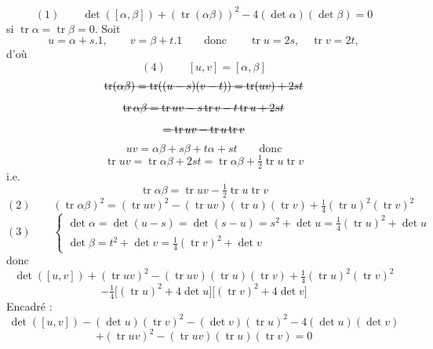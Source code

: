 \documentclass[11pt,a4paper]{article}
\begin{document}
\[
  (1) \qquad \det([\alpha,\beta]) + (\operatorname{tr}(\alpha\beta))^{2} - 4(\det\alpha)(\det\beta) = 0
\]
si $\operatorname{tr}\alpha = \operatorname{tr}\beta = 0$. Soit
\[
  u = \alpha + s.1, \qquad v = \beta + t.1 \qquad \text{donc} \qquad
  \operatorname{tr} u = 2s, \quad \operatorname{tr} v = 2t,
\]
d'où
\[
  (4) \qquad [u,v] = [\alpha,\beta]
\]
\[
  \text{\struck{$\operatorname{tr}(\alpha\beta) = \operatorname{tr}((u-s)(v-t)) = \operatorname{tr}(uv) + 2st$}}
\]
\[
  \text{\struck{$\operatorname{tr}\alpha\beta = \operatorname{tr} uv - s\operatorname{tr} v - t\operatorname{tr} u + 2st$}}
\]
\[
  \text{\struck{$= \operatorname{tr} uv - \operatorname{tr} u \operatorname{tr} v$}}
\]
\[
  uv = \alpha\beta + s\beta + t\alpha + st \qquad \text{donc}
\]
\[
  \operatorname{tr} uv = \operatorname{tr}\alpha\beta + 2st = \operatorname{tr}\alpha\beta + \tfrac{1}{2}\operatorname{tr} u \operatorname{tr} v
\]
i.e.\
\[
  \operatorname{tr}\alpha\beta = \operatorname{tr} uv - \tfrac{1}{2}\operatorname{tr} u \operatorname{tr} v
\]
\[
  (2) \qquad (\operatorname{tr}\alpha\beta)^{2} = (\operatorname{tr} uv)^{2} - (\operatorname{tr} uv)(\operatorname{tr} u)(\operatorname{tr} v) + \tfrac{1}{4}(\operatorname{tr} u)^{2}(\operatorname{tr} v)^{2}
\]
\[
  (3) \qquad
  \begin{cases}
    \det\alpha = \det(u-s) = \det(s-u) = s^{2} + \det u = \tfrac{1}{4}(\operatorname{tr} u)^{2} + \det u \\
    \det\beta = t^{2} + \det v = \tfrac{1}{4}(\operatorname{tr} v)^{2} + \det v
  \end{cases}
\]
donc
\[
  \det([u,v]) + (\operatorname{tr} uv)^{2} - (\operatorname{tr} uv)(\operatorname{tr} u)(\operatorname{tr} v) + \tfrac{1}{4}(\operatorname{tr} u)^{2}(\operatorname{tr} v)^{2}
\]
\[
  - \tfrac{1}{4}\bigl[(\operatorname{tr} u)^{2} + 4\det u\bigr]\bigl[(\operatorname{tr} v)^{2} + 4\det v\bigr]
\]
Encadré :
\[
  \det([u,v]) - (\det u)(\operatorname{tr} v)^{2} - (\det v)(\operatorname{tr} u)^{2} - 4(\det u)(\det v)
\]
\[
  + (\operatorname{tr} uv)^{2} - (\operatorname{tr} uv)(\operatorname{tr} u)(\operatorname{tr} v) = 0
\]
\end{document}
